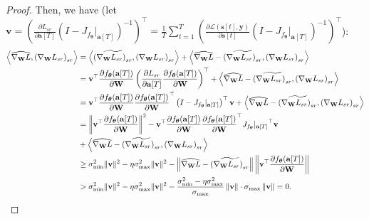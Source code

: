 \documentclass{article}
\begin{document}
\begin{proof}
Then, we have (let $\mathbf{v} = \left(\frac{\partial L_{sr}}{\partial \mathbf{a}[T]} \left(I-J_{f_{\bm{\theta}}}\vert_{\mathbf{a}[T]}\right)^{-1} \right)^\top = \frac{1}{T}\sum_{t=1}^T\left(\frac{\partial \mathcal{L}(\mathbf{s}[t], \mathbf{y})}{\partial \mathbf{s}[t]} \left(I-J_{f_{\bm{\theta}}}\vert_{\mathbf{a}[T]}\right)^{-1}\right)^\top$): 
\begin{align}
    \left<\widehat{\nabla_{\mathbf{W}}L}, \left(\nabla_{\mathbf{W}}L_{sr}\right)_{sr}\right> &= \left<\widetilde{\left(\nabla_{\mathbf{W}}L_{sr}\right)_{sr}}, \left(\nabla_{\mathbf{W}}L_{sr}\right)_{sr}\right> + \left<\widehat{\nabla_{\mathbf{W}}L} - \widetilde{\left(\nabla_{\mathbf{W}}L_{sr}\right)_{sr}}, \left(\nabla_{\mathbf{W}}L_{sr}\right)_{sr}\right>\notag\\
    &= \mathbf{v}^\top \frac{\partial f_{\bm{\theta}}(\mathbf{a}[T])}{\partial \mathbf{W}} \left(\frac{\partial L_{sr}}{\partial \mathbf{a}[T]} \frac{\partial f_{\bm{\theta}}(\mathbf{a}[T])}{\partial \mathbf{W}}\right)^\top + \left<\widehat{\nabla_{\mathbf{W}}L} - \widetilde{\left(\nabla_{\mathbf{W}}L_{sr}\right)_{sr}}, \left(\nabla_{\mathbf{W}}L_{sr}\right)_{sr}\right>\notag\\
    &= \mathbf{v}^\top \frac{\partial f_{\bm{\theta}}(\mathbf{a}[T])}{\partial \mathbf{W}} {\frac{\partial f_{\bm{\theta}}(\mathbf{a}[T])}{\partial \mathbf{W}}}^\top \left(I-J_{f_{\bm{\theta}}}\vert_{\mathbf{a}[T]}\right)^\top \mathbf{v} + \left<\widehat{\nabla_{\mathbf{W}}L} - \widetilde{\left(\nabla_{\mathbf{W}}L_{sr}\right)_{sr}}, \left(\nabla_{\mathbf{W}}L_{sr}\right)_{sr}\right>\notag\\
    &= \left\lVert \mathbf{v}^\top \frac{\partial f_{\bm{\theta}}(\mathbf{a}[T])}{\partial \mathbf{W}} \right\rVert^2 - \mathbf{v}^\top \frac{\partial f_{\bm{\theta}}(\mathbf{a}[T])}{\partial \mathbf{W}} {\frac{\partial f_{\bm{\theta}}(\mathbf{a}[T])}{\partial \mathbf{W}}}^\top {J_{f_{\bm{\theta}}}\vert_{\mathbf{a}[T]}}^\top \mathbf{v}\notag\\
    &+ \left<\widehat{\nabla_{\mathbf{W}}L} - \widetilde{\left(\nabla_{\mathbf{W}}L_{sr}\right)_{sr}}, \left(\nabla_{\mathbf{W}}L_{sr}\right)_{sr}\right>\notag\\
    &\geq \sigma_{\text{min}}^2 \lVert \mathbf{v} \rVert^2 - \eta \sigma_{\text{max}}^2 \lVert \mathbf{v} \rVert^2 - \left\lVert \widehat{\nabla_{\mathbf{W}}L} - \widetilde{\left(\nabla_{\mathbf{W}}L_{sr}\right)_{sr}} \right\rVert  \left\lVert \mathbf{v}^\top \frac{\partial f_{\bm{\theta}}(\mathbf{a}[T])}{\partial \mathbf{W}} \right\rVert \notag\\
    &> \sigma_{\text{min}}^2 \lVert \mathbf{v} \rVert^2 - \eta \sigma_{\text{max}}^2 \lVert \mathbf{v} \rVert^2 - \frac{\sigma_{\text{min}}^2-\eta \sigma_{\text{max}}^2}{\sigma_{\text{max}}}\left\lVert \mathbf{v} \right\rVert \cdot \sigma_{\text{max}} \left\lVert \mathbf{v} \right\rVert = 0.
\end{align}


\end{proof}
\end{document}
